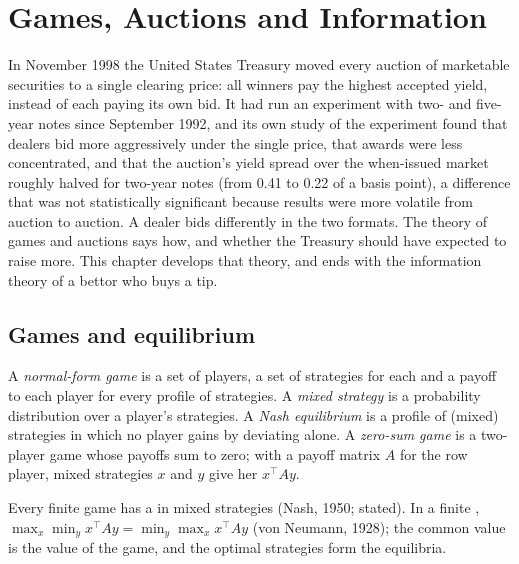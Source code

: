 \chapter{Games, Auctions and Information}\label{ch:qm:games-auctions-and-information}

In November 1998 the United States Treasury moved every auction of marketable securities to a single clearing price: all winners pay the highest accepted yield, instead of each paying its own bid.
It had run an experiment with two- and five-year notes since September 1992, and its own study of the experiment found that dealers bid more aggressively under the single price, that awards were less
concentrated, and that the auction's yield spread over the when-issued market roughly halved for two-year notes (from 0.41 to 0.22 of a basis point), a difference that was not statistically
significant because results were more volatile from auction to auction. A dealer bids differently in the two formats. The theory of games and auctions says how, and whether the Treasury should have
expected to raise more. This chapter develops that theory, and ends with the information theory of a bettor who buys a tip.

\section{Games and equilibrium}

\begin{definition}\label{def:qm:games-auctions-and-information:game}
A \emph{normal-form game} is a set of players, a set of strategies for each and a payoff to each player for every profile of strategies. A \emph{mixed strategy} is a
probability distribution over a player's strategies. A \emph{Nash equilibrium} is a profile of (mixed) strategies in which no player gains by deviating alone. A \emph{zero-sum
game} is a two-player game whose payoffs sum to zero; with a payoff matrix $A$ for the row player, mixed strategies $x$ and $y$ give her $x^\top Ay$.
\end{definition}

\begin{theorem}\label{thm:qm:games-auctions-and-information:minimax}
Every finite game has a  in mixed strategies (Nash, 1950; stated). In a finite , $\max_x\min_yx^\top Ay = \min_y\max_xx^\top Ay$ (von Neumann, 1928); the common value is the value
of the game, and the optimal strategies form the equilibria.
\end{theorem}

